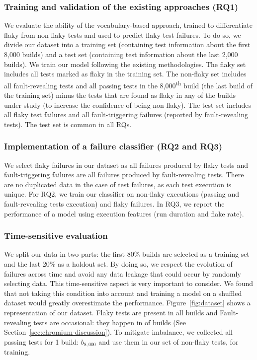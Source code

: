 \subsubsection{Training and validation of the existing approaches (RQ1)} 
We evaluate the ability of the vocabulary-based approach, trained to differentiate flaky from non-flaky tests and used to predict flaky test failures. To do so, we divide our dataset into a training set (containing test information about the first 8,000 builds) and a test set (containing test information about the last 2,000 builds). We train our model following the existing methodologies. The flaky set includes all tests marked as flaky in the training set. 
The non-flaky set includes all fault-revealing tests and all passing tests in the 8,000\textsuperscript{th} build (\ie the last build of the training set) minus the tests that are found as flaky in any of the builds under study (to increase the confidence of being non-flaky). The test set includes all flaky test failures and all fault-triggering failures (reported by fault-revealing tests). The test set is common in all RQs.

\subsubsection{Implementation of a failure classifier (RQ2 and RQ3)}
We select flaky failures in our dataset as all failures produced by flaky tests and fault-triggering failures are all failures produced by fault-revealing tests. There are no duplicated data in the case of test failures, as each test execution is unique. For RQ2, we train our classifier on non-flaky executions (passing and fault-revealing tests execution) and flaky failures. In RQ3, we report the performance of a model using execution features (run duration and flake rate).

\subsubsection{Time-sensitive evaluation}
We split our data in two parts: the first 80\% builds are selected as a training set and the last 20\% as a holdout set. By doing so, we respect the evolution of failures across time and avoid any data leakage that could occur by randomly selecting data. This time-sensitive aspect is very important to consider. We found that not taking this condition into account and training a model on a shuffled dataset would greatly overestimate the performance. Figure~\ref{fig:dataset} shows a representation of our dataset. Flaky tests are present in all builds and Fault-revealing tests are occasional: they happen in  of builds (See Section~\ref{sec:chromium-discussion}). To mitigate imbalance, we collected all passing tests for 1 build: $b_{8,000}$ and use them in our set of non-flaky tests, for training.

